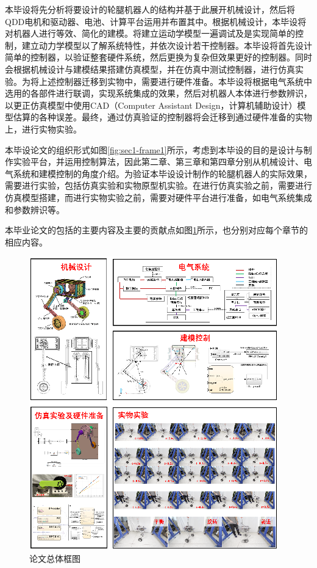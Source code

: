 本毕设将先分析将要设计的轮腿机器人的结构并基于此展开机械设计，然后将QDD电机和驱动器、电池、计算平台运用并布置其中。根据机械设计，本毕设将对机器人进行等效、简化的建模。将建立运动学模型一遍调试及是实现简单的控制，建立动力学模型以了解系统特性，并依次设计若干控制器。本毕设将首先设计简单的控制器，以验证整套硬件系统，然后更换为复杂但效果更好的控制器。同时会根据机械设计与建模结果搭建仿真模型，并在仿真中测试控制器，进行仿真实验。为将上述控制器迁移到实物中，需要进行硬件准备。本毕设将根据电气系统中选用的各部件进行联调，实现系统集成的效果，然后对机器人本体进行参数辨识，以更正仿真模型中使用CAD（Computer Assistant Design，计算机辅助设计）模型估算的各种误差。最终，通过仿真验证的控制器将会迁移到通过硬件准备的实物上，进行实物实验。

本毕设论文的组织形式如图\ref{fig:sec1-frame1}所示，考虑到本毕设的目的是设计与制作实验平台，并运用控制算法，因此第二章、第三章和第四章分别从机械设计、电气系统和建模控制的角度介绍。为验证本毕设设计制作的轮腿机器人的实际效果，需要进行实验，包括仿真实验和实物原型机实验。在进行仿真实验之前，需要进行仿真模型搭建，而进行实物实验之前，需要对硬件平台进行准备，如电气系统集成和参数辨识等。

本毕业论文的包括的主要内容及主要的贡献点如图\ref{fig:sec1-frame2}所示，也分别对应每个章节的相应内容。

\begin{figure}[h!]
  \centering
  \includegraphics[width=0.9\linewidth]{figures/Sec1/frame2.1.png}
  \caption{
  论文总体框图
  }
  \label{fig:sec1-frame2}
   \vspace{4pt}
\end{figure}

